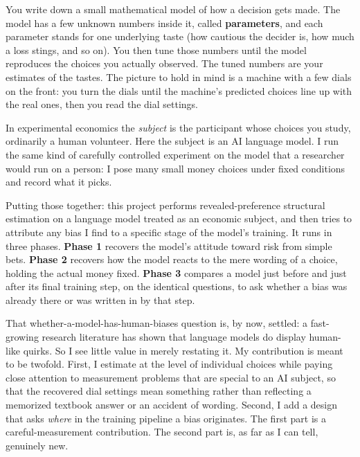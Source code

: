 \documentclass[11pt]{article}
\newcommand{\term}[1]{\textbf{\color{mossdk}#1}}
\begin{document}
\begin{defbox}
You write down a small mathematical model of how a decision gets made. The model has a few unknown
numbers inside it, called \term{parameters}, and each parameter stands for one underlying taste (how
cautious the decider is, how much a loss stings, and so on). You then tune those numbers until the
model reproduces the choices you actually observed. The tuned numbers are your estimates of the tastes.
The picture to hold in mind is a machine with a few dials on the front: you turn the dials until the
machine's predicted choices line up with the real ones, then you read the dial settings.
\end{defbox}

\begin{defbox}
In experimental economics the \emph{subject} is the participant whose choices you study, ordinarily a
human volunteer. Here the subject is an AI language model. I run the same kind of carefully controlled
experiment on the model that a researcher would run on a person: I pose many small money choices under
fixed conditions and record what it picks.
\end{defbox}

Putting those together: this project performs revealed-preference structural estimation on a language
model treated as an economic subject, and then tries to attribute any bias I find to a specific stage
of the model's training. It runs in three phases. \term{Phase 1} recovers the model's attitude toward
risk from simple bets. \term{Phase 2} recovers how the model reacts to the mere wording of a choice,
holding the actual money fixed. \term{Phase 3} compares a model just before and just after its final
training step, on the identical questions, to ask whether a bias was already there or was written in by
that step.

That whether-a-model-has-human-biases question is, by now, settled: a fast-growing research literature
has shown that language models do display human-like quirks. So I see little value in merely restating
it. My contribution is meant to be twofold. First, I estimate at the level of individual choices while
paying close attention to measurement problems that are special to an AI subject, so that the recovered
dial settings mean something rather than reflecting a memorized textbook answer or an accident of
wording. Second, I add a design that asks \emph{where} in the training pipeline a bias originates. The
first part is a careful-measurement contribution. The second part is, as far as I can tell, genuinely
new.
\end{document}
